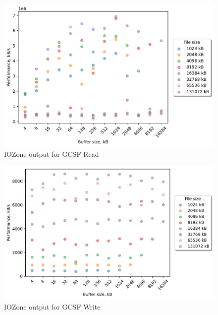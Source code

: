 \begin{figure}[!htb]
	\label{fig:bench_gcsf_read}
	\begin{center}
		\includegraphics[width=1.0\textwidth]{figures/benchmarking/gcsf/Read.pdf}
	\end{center}
	\caption{IOZone output for GCSF Read}
\end{figure}

\begin{figure}[!htb]
	\label{fig:bench_gcsf_write}
	\begin{center}
		\includegraphics[width=1.0\textwidth]{figures/benchmarking/gcsf/Write.pdf}
	\end{center}
	\caption{IOZone output for GCSF Write}
\end{figure}


